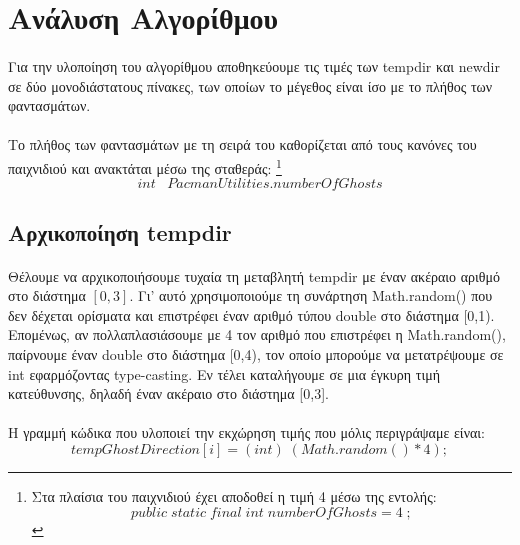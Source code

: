 \documentclass[12pt,a4paper]{article}
\newcommand{\lt}{\latintext}
\newcommand{\gt}{\greektext}
\begin{document}
	\section{Ανάλυση Αλγορίθμου}\paragraph*{}
	Για την υλοποίηση του αλγορίθμου αποθηκεύουμε τις τιμές των {\lt tempdir} και {\lt newdir} σε δύο μονοδιάστατους πίνακες, των οποίων το μέγεθος είναι ίσο με το πλήθος των φαντασμάτων. 
	\paragraph*{}Το πλήθος των φαντασμάτων με τη σειρά του καθορίζεται από τους κανόνες του παιχνιδιού και ανακτάται μέσω της σταθεράς:	\footnote{Στα πλαίσια του παιχνιδιού έχει αποδοθεί η τιμή 4 μέσω της εντολής:
		\begin{equation*}
		public \; static\; final\; int\; numberOfGhosts=4\; ;
		\end{equation*}}
\begin{equation*}
int \; \; \;  PacmanUtilities.numberOfGhosts
\end{equation*} 	
 
	
	\subsection{Αρχικοποίηση \lt tempdir} \paragraph*{}
	Θέλουμε να αρχικοποιήσουμε τυχαία τη μεταβλητή {\lt tempdir} με έναν ακέραιο αριθμό στο διάστημα $\left[0,3\right]$. Γι' αυτό χρησιμοποιούμε τη συνάρτηση {\lt Math.random()} που δεν δέχεται ορίσματα και επιστρέφει έναν αριθμό τύπου \lt double \gt στο διάστημα [0,1). Επομένως, αν πολλαπλασιάσουμε με 4 τον αριθμό που επιστρέφει η {\lt Math.random()}, παίρνουμε έναν \lt double \gt στο διάστημα [0,4), τον οποίο μπορούμε να μετατρέψουμε σε {\lt int} εφαρμόζοντας {\lt type-casting}. Εν τέλει καταλήγουμε σε μια έγκυρη τιμή κατεύθυνσης, δηλαδή έναν ακέραιο στο διάστημα [0,3]. \paragraph*{} Η γραμμή κώδικα που υλοποιεί την εκχώρηση τιμής που μόλις περιγράψαμε είναι: 
	\begin{equation*}
	tempGhostDirection[i] = (int)\;(Math.random()*4);
	\end{equation*}
	
\end{document}
